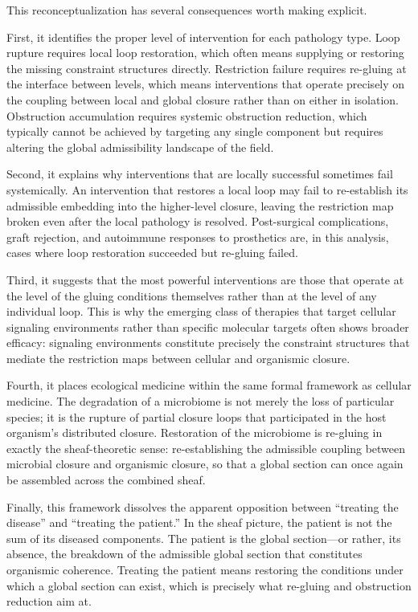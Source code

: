 \documentclass[11pt, a4paper]{article}
\theoremstyle{plain}
\theoremstyle{definition}
\theoremstyle{remark}
\begin{document}
This reconceptualization has several consequences worth making explicit.

First, it identifies the proper level of intervention for each pathology type. Loop rupture requires local loop restoration, which often means supplying or restoring the missing constraint structures directly. Restriction failure requires re-gluing at the interface between levels, which means interventions that operate precisely on the coupling between local and global closure rather than on either in isolation. Obstruction accumulation requires systemic obstruction reduction, which typically cannot be achieved by targeting any single component but requires altering the global admissibility landscape of the field.

Second, it explains why interventions that are locally successful sometimes fail systemically. An intervention that restores a local loop may fail to re-establish its admissible embedding into the higher-level closure, leaving the restriction map broken even after the local pathology is resolved. Post-surgical complications, graft rejection, and autoimmune responses to prosthetics are, in this analysis, cases where loop restoration succeeded but re-gluing failed.

Third, it suggests that the most powerful interventions are those that operate at the level of the gluing conditions themselves rather than at the level of any individual loop. This is why the emerging class of therapies that target cellular signaling environments rather than specific molecular targets often shows broader efficacy: signaling environments constitute precisely the constraint structures that mediate the restriction maps between cellular and organismic closure.

Fourth, it places ecological medicine within the same formal framework as cellular medicine. The degradation of a microbiome is not merely the loss of particular species; it is the rupture of partial closure loops that participated in the host organism's distributed closure. Restoration of the microbiome is re-gluing in exactly the sheaf-theoretic sense: re-establishing the admissible coupling between microbial closure and organismic closure, so that a global section can once again be assembled across the combined sheaf.

Finally, this framework dissolves the apparent opposition between ``treating the disease'' and ``treating the patient.'' In the sheaf picture, the patient is not the sum of its diseased components. The patient is the global section---or rather, its absence, the breakdown of the admissible global section that constitutes organismic coherence. Treating the patient means restoring the conditions under which a global section can exist, which is precisely what re-gluing and obstruction reduction aim at.
\end{document}
